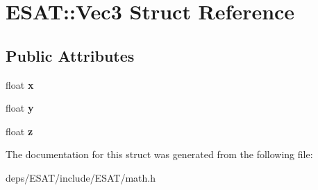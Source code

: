 \hypertarget{struct_e_s_a_t_1_1_vec3}{}\section{E\+S\+AT\+:\+:Vec3 Struct Reference}
\label{struct_e_s_a_t_1_1_vec3}
\subsection*{Public Attributes}
\begin{DoxyCompactItemize}
\item 
\mbox{\label{struct_e_s_a_t_1_1_vec3_a31f95695776c7f703e1dfe6464f1f272}} 
float {\bfseries x}
\item 
\mbox{\label{struct_e_s_a_t_1_1_vec3_a0aed8108b15097e8c90af5da4bde41bd}} 
float {\bfseries y}
\item 
\mbox{\label{struct_e_s_a_t_1_1_vec3_ab93d7a3e39ad6c5c5186e601559bc8c0}} 
float {\bfseries z}
\end{DoxyCompactItemize}


The documentation for this struct was generated from the following file\+:\begin{DoxyCompactItemize}
\item 
deps/\+E\+S\+A\+T/include/\+E\+S\+A\+T/math.\+h\end{DoxyCompactItemize}
